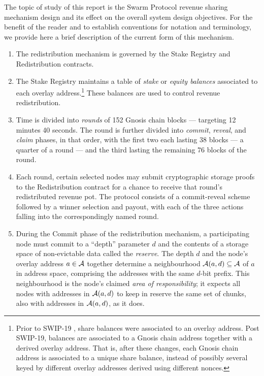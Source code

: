 The topic of study of this report is the Swarm Protocol revenue sharing mechanism design and its effect on the overall system design objectives.
%
For the benefit of the reader and to establish conventions for notation and terminology, we provide here a brief description of the current form of this mechanism.
%
\begin{enumerate}
  \item 
    The redistribution mechanism is governed by the Stake Registry and Redistribution contracts.
  
  \item
    The Stake Registry maintains a table of \emph{stake} or \emph{equity balances} associated to each overlay address.\footnote{    Prior to SWIP-19 \cite{swip-19}, share balances were associated to an overlay address.
    Post SWIP-19, balances are associated to a Gnosis chain address together with a derived overlay address.
    That is, after these changes, each Gnosis chain address is associated to a unique share balance, instead of possibly several keyed by different overlay addresses derived using different nonces.}
    These balances are used to control revenue redistribution.

  \item
    Time is divided into \emph{rounds} of 152 Gnosis chain blocks --- targeting 12 minutes 40 seconds.
    The round is further divided into \emph{commit}, \emph{reveal}, and \emph{claim} phases, in that order, with the first two each lasting 38 blocks --- a quarter of a round --- and the third lasting the remaining 76 blocks of the round.

  \item
    Each round, certain selected nodes may submit cryptographic storage proofs to the Redistribution contract for a chance to receive that round's redistributed revenue pot.
    The protocol consists of a commit-reveal scheme followed by a winner selection and payout, with each of the three actions falling into the correspondingly named round.

  \item
    During the Commit phase of the redistribution mechanism, a participating node must commit to a ``depth'' parameter $d$ and the contents of a storage space of non-evictable data called the \emph{reserve}.
    The depth $d$ and the node's overlay address $a\in\mathcal{A}$ together determine a neighbourhood $\mathcal{A}(a,d)\subseteq\mathcal{A}$ of $a$ in address space, comprising the addresses with the same $d$-bit prefix.
    This neighbourhood is the node's claimed \emph{area of responsibility}; it expects all nodes with addresses in $\mathcal{A}(a,d)$ to keep in reserve the same set of chunks, also with addresses in $\mathcal{A}(a,d)$, as it does.
    

\end{enumerate}
